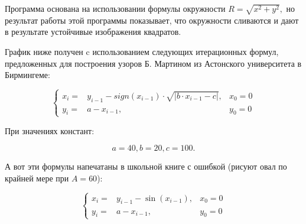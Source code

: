 \documentclass[a4paper]{minimal}
\begin{document}
\newcount\dv
\newcount\res

\newcommand{\calcmod}[1]{
\dv=#1
\res=\the\dv
\divide\dv by 4
\multiply\dv by -4
\advance\res by \the\dv
}

Программа основана на использовании формулы окружности $R = \sqrt{x^2+y^2},$ но результат работы этой программы показывает, что окружности сливаются и дают в результате устойчивые
изображения квадратов.

График ниже получен c использованием следующих итерационных формул, предложенных для построения узоров Б. Мартином из Астонского университета в Бирмингеме:

$$
\left\{\begin{aligned}
x_i  = & y_{i-1} - sign(x_{i-1})\cdot\sqrt{\left|b\cdot x_{i-1} - c\right|},&x_0 = 0\\
y_i  = & a - x_{i-1},&y_0 = 0
\end{aligned}\right.
$$

При значениях констант:

$$
a = 40, b = 20, c = 100.
$$


А вот эти формулы напечатаны в школьной книге с ошибкой (рисуют овал по крайней мере при $A=60$):

$$
\left\{\begin{aligned}
x_i  = & y_{i-1} - \sin\left(x_{i-1}\right),&x_0 = 0\\
y_i  = & a - x_{i-1},&y_0 = 0
\end{aligned}\right.
$$
\end{document}
